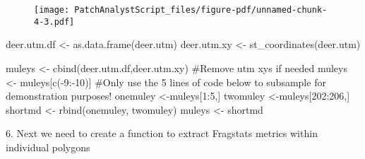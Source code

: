 \documentclass[
  letterpaper,
]{book}
\newenvironment{Shaded}{\begin{snugshade}}{\end{snugshade}}
\newcommand{\AttributeTok}[1]{\textcolor[rgb]{0.40,0.45,0.13}{#1}}
\newcommand{\CommentTok}[1]{\textcolor[rgb]{0.37,0.37,0.37}{#1}}
\newcommand{\ControlFlowTok}[1]{\textcolor[rgb]{0.00,0.23,0.31}{#1}}
\newcommand{\DecValTok}[1]{\textcolor[rgb]{0.68,0.00,0.00}{#1}}
\newcommand{\FunctionTok}[1]{\textcolor[rgb]{0.28,0.35,0.67}{#1}}
\newcommand{\NormalTok}[1]{\textcolor[rgb]{0.00,0.23,0.31}{#1}}
\newcommand{\OtherTok}[1]{\textcolor[rgb]{0.00,0.23,0.31}{#1}}
\newcommand{\SpecialCharTok}[1]{\textcolor[rgb]{0.37,0.37,0.37}{#1}}
\newcommand{\StringTok}[1]{\textcolor[rgb]{0.13,0.47,0.30}{#1}}
\begin{document}
\begin{figure}[H]

{\centering \texttt{[image: PatchAnalystScript\_files/figure-pdf/unnamed-chunk-4-3.pdf]}

}

\end{figure}

\begin{Shaded}
\begin{Highlighting}[]
\NormalTok{deer.utm.df }\OtherTok{\textless{}{-}} \FunctionTok{as.data.frame}\NormalTok{(deer.utm)}
\NormalTok{deer.utm.xy }\OtherTok{\textless{}{-}} \FunctionTok{st\_coordinates}\NormalTok{(deer.utm)}
 
\NormalTok{muleys }\OtherTok{\textless{}{-}} \FunctionTok{cbind}\NormalTok{(deer.utm.df,deer.utm.xy)}
\CommentTok{\#Remove utm xys if needed}
\NormalTok{muleys }\OtherTok{\textless{}{-}}\NormalTok{ muleys[}\FunctionTok{c}\NormalTok{(}\SpecialCharTok{{-}}\DecValTok{9}\SpecialCharTok{:{-}}\DecValTok{10}\NormalTok{)]}
\CommentTok{\#Only use the 5 lines of code below to subsample for demonstration purposes!}
\NormalTok{onemuley }\OtherTok{\textless{}{-}}\NormalTok{muleys[}\DecValTok{1}\SpecialCharTok{:}\DecValTok{5}\NormalTok{,]}
\NormalTok{twomuley }\OtherTok{\textless{}{-}}\NormalTok{muleys[}\DecValTok{202}\SpecialCharTok{:}\DecValTok{206}\NormalTok{,]}
\NormalTok{shortmd }\OtherTok{\textless{}{-}} \FunctionTok{rbind}\NormalTok{(onemuley, twomuley)}
\NormalTok{muleys }\OtherTok{\textless{}{-}}\NormalTok{ shortmd}
\end{Highlighting}
\end{Shaded}

6. Next we need to create a function to extract Fragstats metrics within
individual polygons

\begin{Shaded}
\end{Shaded}
\end{document}
